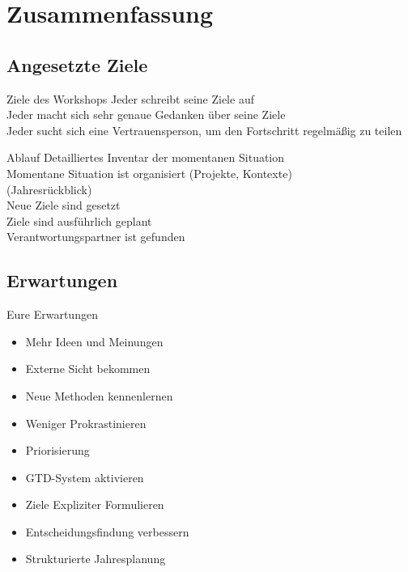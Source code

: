 \section{Zusammenfassung}

\subsection{Angesetzte Ziele}

\begin{frame}[c]{Ziele des Workshops}
    \Large
     \cmb Jeder schreibt seine Ziele auf \\
     \cmb Jeder macht sich sehr genaue Gedanken über seine Ziele \\
     \cmb Jeder sucht sich eine Vertrauensperson, um den Fortschritt regelmäßig zu teilen \\
\end{frame}


\begin{frame}[c]{Ablauf}
    \large
     \cmb Detailliertes Inventar der momentanen Situation \\
     \cmb Momentane Situation ist organisiert (Projekte, Kontexte) \\
     \cmb (Jahresrückblick) \\
     \cmb Neue Ziele sind gesetzt \\
     \cmb Ziele sind ausführlich geplant \\
     \cmb Verantwortungspartner ist gefunden \\
\end{frame}


\subsection{Erwartungen}

\begin{frame}[c]{Eure Erwartungen}
    \begin{itemize}
        \item Mehr Ideen und Meinungen
        \item Externe Sicht bekommen
        \item Neue Methoden kennenlernen
        \item Weniger Prokrastinieren
        \item Priorisierung
        \item GTD-System aktivieren
        \item Ziele Expliziter Formulieren
        \item Entscheidungsfindung verbessern
        \item Strukturierte Jahresplanung
    \end{itemize}
\end{frame}


